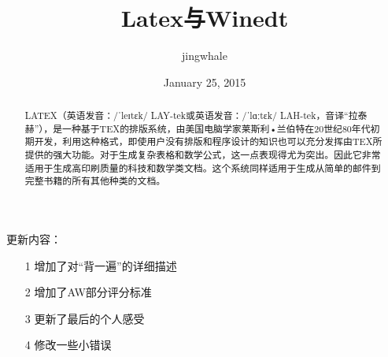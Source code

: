 \documentclass[UTF8]{ctexart}
\begin{document}
 
\title{Latex与Winedt}
\author{jingwhale}
\date{January 25, 2015}
\maketitle
 
\begin{abstract}
LATEX（英语发音：/ˈleɪtɛk/ LAY-tek或英语发音：/ˈlɑːtɛk/ LAH-tek，音译“拉泰赫”），是一种基于TEX的排版系统，由美国电脑学家莱斯利•兰伯特在20世纪80年代初期开发，利用这种格式，即使用户没有排版和程序设计的知识也可以充分发挥由TEX所提供的强大功能。对于生成复杂表格和数学公式，这一点表现得尤为突出。因此它非常适用于生成高印刷质量的科技和数学类文档。这个系统同样适用于生成从简单的邮件到完整书籍的所有其他种类的文档。
\end{abstract}
\newpage
{\centering
    更新内容：
    \begin{enumerate}
        \item[1]增加了对“背一遍”的详细描述
        \item[2]增加了AW部分评分标准
        \item[3]更新了最后的个人感受
        \item[4]修改一些小错误
    \end{enumerate}
    }
    \newpage
 
\end{document}
